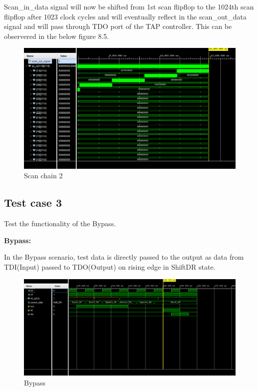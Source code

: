  Scan\_in\_data signal will now be shifted from 1st scan flipflop to the 1024th scan flipflop after 1023 clock cycles and will eventually reflect in the scan\_out\_data signal and will pass through TDO port of the TAP controller. This can be observered in the below figure 8.5.


\begin{figure}[h]
    \centering
    \includegraphics[width=0.8\linewidth]{Image/RO3.png}
    \caption{Scan chain 2}
    \label{Scan chain 2}
\end{figure}
\pagebreak
\vspace{2mm}

\subsection{Test case 3}
Test the functionality of the Bypass.
\vspace{2mm}

\textbf{Bypass:}
\vspace{2mm}

In the Bypass scenario, test data is directly passed to the output as data from TDI(Input) passed to TDO(Output) on rising edge in ShiftDR state.

\begin{figure}[h]
    \centering
    \includegraphics[width=0.8\linewidth]{Image/Bypass.png}
    \caption{Bypass}
    \label{fig:Bypass}
\end{figure}

